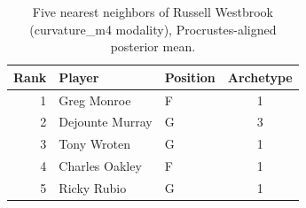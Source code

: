 \begin{table}[htbp]
  \centering\small
  \begin{tabular}{rllc}
    \toprule
    Rank & Player & Position & Archetype \\
    \midrule
    1 & Greg Monroe & F & 1 \\
    2 & Dejounte Murray & G & 3 \\
    3 & Tony Wroten & G & 1 \\
    4 & Charles Oakley & F & 1 \\
    5 & Ricky Rubio & G & 1 \\
    \bottomrule
  \end{tabular}
  \caption{Five nearest neighbors of Russell Westbrook (curvature_m4 modality), Procrustes-aligned posterior mean.}
  \label{tab:Russell_Westbrook_neighbors_curvature_m4}
\end{table}


